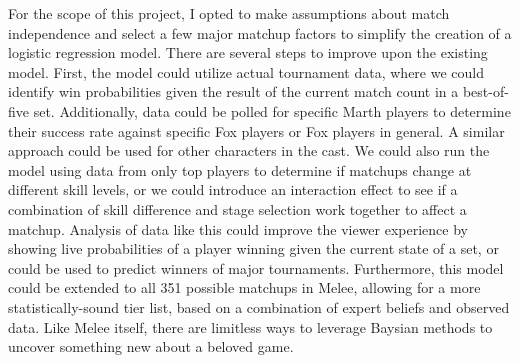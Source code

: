 \indent For the scope of this project, I opted to make assumptions about match independence and select a few major matchup factors to simplify the creation of a logistic regression model. There are several steps to improve upon the existing model. First, the model could utilize actual tournament data, where we could identify win probabilities given the result of the current match count in a best-of-five set. Additionally, data could be polled for specific Marth players to determine their success rate against specific Fox players or Fox players in general. A similar approach could be used for other characters in the cast. We could also run the model using data from only top players to determine if matchups change at different skill levels, or we could introduce an interaction effect to see if a combination of skill difference and stage selection work together to affect a matchup. Analysis of data like this could improve the viewer experience by showing live probabilities of a player winning given the current state of a set, or could be used to predict winners of major tournaments. Furthermore, this model could be extended to all 351 possible matchups in Melee, allowing for a more statistically-sound tier list, based on a combination of expert beliefs and observed data. Like Melee itself, there are limitless ways to leverage Baysian methods to uncover something new about a beloved game.

